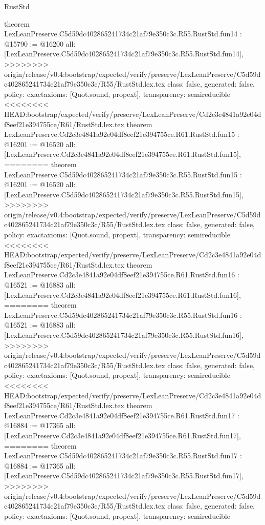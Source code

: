 \begin{lexlean}{RustStd}
\begin{coremodule}
{\begin{coremodule}
{{{{{{{{{{{{{{{{{theorem LexLeanPreserve.C5d59dc402865241734c21af79e350c3c.R55.RustStd.fun14 : @15790 := @16200 {
  all: [LexLeanPreserve.C5d59dc402865241734c21af79e350c3c.R55.RustStd.fun14],
>>>>>>>> origin/release/v0.4:bootstrap/expected/verify/preserve/LexLeanPreserve/C5d59dc402865241734c21af79e350c3c/R55/RustStd.lex.tex
  class: false,
  generated: false,
  policy: exact{axioms: [Quot.sound, propext]},
  transparency: semireducible
}
<<<<<<<< HEAD:bootstrap/expected/verify/preserve/LexLeanPreserve/Cd2c3e4841a92e04df8eef21e394755ce/R61/RustStd.lex.tex
theorem LexLeanPreserve.Cd2c3e4841a92e04df8eef21e394755ce.R61.RustStd.fun15 : @16201 := @16520 {
  all: [LexLeanPreserve.Cd2c3e4841a92e04df8eef21e394755ce.R61.RustStd.fun15],
========
theorem LexLeanPreserve.C5d59dc402865241734c21af79e350c3c.R55.RustStd.fun15 : @16201 := @16520 {
  all: [LexLeanPreserve.C5d59dc402865241734c21af79e350c3c.R55.RustStd.fun15],
>>>>>>>> origin/release/v0.4:bootstrap/expected/verify/preserve/LexLeanPreserve/C5d59dc402865241734c21af79e350c3c/R55/RustStd.lex.tex
  class: false,
  generated: false,
  policy: exact{axioms: [Quot.sound, propext]},
  transparency: semireducible
}
<<<<<<<< HEAD:bootstrap/expected/verify/preserve/LexLeanPreserve/Cd2c3e4841a92e04df8eef21e394755ce/R61/RustStd.lex.tex
theorem LexLeanPreserve.Cd2c3e4841a92e04df8eef21e394755ce.R61.RustStd.fun16 : @16521 := @16883 {
  all: [LexLeanPreserve.Cd2c3e4841a92e04df8eef21e394755ce.R61.RustStd.fun16],
========
theorem LexLeanPreserve.C5d59dc402865241734c21af79e350c3c.R55.RustStd.fun16 : @16521 := @16883 {
  all: [LexLeanPreserve.C5d59dc402865241734c21af79e350c3c.R55.RustStd.fun16],
>>>>>>>> origin/release/v0.4:bootstrap/expected/verify/preserve/LexLeanPreserve/C5d59dc402865241734c21af79e350c3c/R55/RustStd.lex.tex
  class: false,
  generated: false,
  policy: exact{axioms: [Quot.sound, propext]},
  transparency: semireducible
}
<<<<<<<< HEAD:bootstrap/expected/verify/preserve/LexLeanPreserve/Cd2c3e4841a92e04df8eef21e394755ce/R61/RustStd.lex.tex
theorem LexLeanPreserve.Cd2c3e4841a92e04df8eef21e394755ce.R61.RustStd.fun17 : @16884 := @17365 {
  all: [LexLeanPreserve.Cd2c3e4841a92e04df8eef21e394755ce.R61.RustStd.fun17],
========
theorem LexLeanPreserve.C5d59dc402865241734c21af79e350c3c.R55.RustStd.fun17 : @16884 := @17365 {
  all: [LexLeanPreserve.C5d59dc402865241734c21af79e350c3c.R55.RustStd.fun17],
>>>>>>>> origin/release/v0.4:bootstrap/expected/verify/preserve/LexLeanPreserve/C5d59dc402865241734c21af79e350c3c/R55/RustStd.lex.tex
  class: false,
  generated: false,
  policy: exact{axioms: [Quot.sound, propext]},
  transparency: semireducible
}}}}}}}}}}}}}}}}}}}}}
\end{coremodule}}
\end{coremodule}
\end{lexlean}

